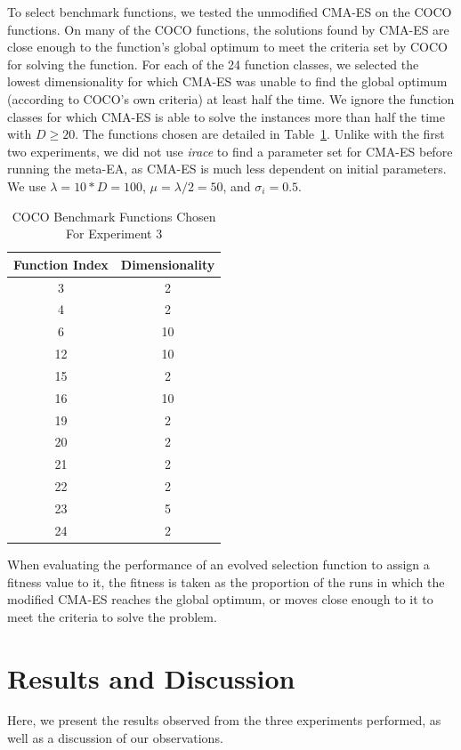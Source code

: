 \documentclass[sigconf]{acmart}
\begin{document}
To select benchmark functions, we tested the unmodified CMA-ES on the COCO functions. On many of the COCO functions, the solutions found by CMA-ES are close enough to the function's global optimum to meet the criteria set by COCO for solving the function. For each of the 24 function classes, we selected the lowest dimensionality for which CMA-ES was unable to find the global optimum (according to COCO's own criteria) at least half the time. We ignore the function classes for which CMA-ES is able to solve the instances more than half the time with $D\geq20$. The functions chosen are detailed in Table~\ref{tab:experiment3chosenFunctions}. Unlike with the first two experiments, we did not use \textit{irace} to find a parameter set for CMA-ES before running the meta-EA, as CMA-ES is much less dependent on initial parameters. We use $\lambda=10*D=100$, $\mu = \lambda/2 = 50$, and $\sigma_i = 0.5$. 

\begin{table}
	\centering
	\caption{COCO Benchmark Functions Chosen For Experiment 3}
	\label{tab:experiment3chosenFunctions}
	\begin{tabular}{c|c}
		\toprule
		Function Index & Dimensionality \\
		\midrule
		3 & 2\\
		\hline
		4& 2\\
		\hline
		6& 10\\
		\hline
		12& 10\\
		\hline
		15& 2\\
		\hline
		16& 10\\
		\hline
		19& 2\\
		\hline
		20& 2\\
		\hline
		21& 2\\
		\hline
		22& 2\\
		\hline
		23& 5\\
		\hline
		24& 2\\                        
		
		\bottomrule
	\end{tabular}
\end{table}

When evaluating the performance of an evolved selection function to assign a fitness value to it, the fitness is taken as the proportion of the runs in which the modified CMA-ES reaches the global optimum, or moves close enough to it to meet the criteria to solve the problem.

\section{Results and Discussion}
\label{Results}
Here, we present the results observed from the three experiments performed, as well as a discussion of our observations.
\end{document}
